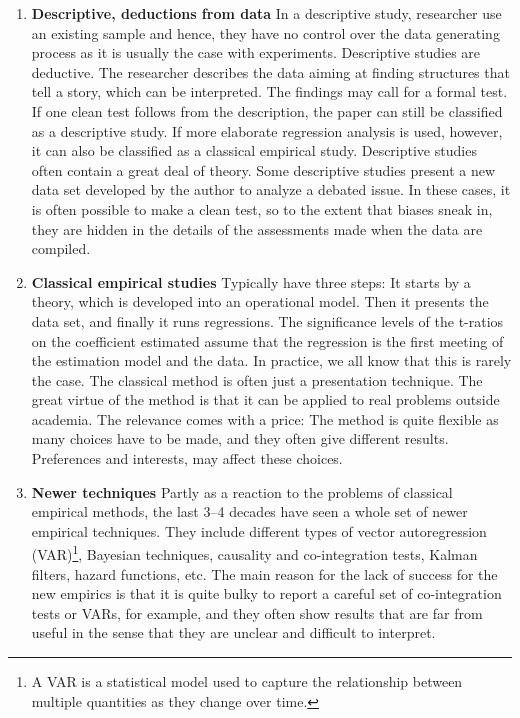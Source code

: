 \documentclass[
  12pt,
  oneside]{book}
\theoremstyle{definition}
\theoremstyle{definition}
\theoremstyle{definition}
\theoremstyle{definition}
\theoremstyle{remark}
\begin{document}
\begin{enumerate}
\def\labelenumi{\arabic{enumi}.}
\setcounter{enumi}{5}
\item
  \textbf{Descriptive, deductions from data} In a descriptive study, researcher use an existing sample and hence, they have no control over the data generating process as it is usually the case with experiments. Descriptive studies are deductive. The researcher describes the data aiming at finding structures that tell a story, which can be interpreted. The findings may call for a formal test. If one clean test follows from the description, the paper can still be classified as a descriptive study. If more elaborate regression analysis is used, however, it can also be classified as a classical empirical study. Descriptive studies often contain a great deal of theory. Some descriptive studies present a new data set developed by the author to analyze a debated issue. In these cases, it is often possible to make a clean test, so to the extent that biases sneak in, they are hidden in the details of the assessments made when the data are compiled.
\item
  \textbf{Classical empirical studies}
  Typically have three steps: It starts by a theory, which is developed into an operational model. Then it presents the data set, and finally it runs regressions. The significance levels of the t-ratios on the coefficient estimated assume that the regression is the first meeting of the estimation model and the data. In practice, we all know that this is rarely the case. The classical method is often just a presentation technique. The great virtue of the method is that it can be applied to real problems outside academia. The relevance comes with a price: The method is quite flexible as many choices have to be made, and they often give different results. Preferences and interests, may affect these choices.
\item
  \textbf{Newer techniques}
  Partly as a reaction to the problems of classical empirical methods, the last 3--4 decades have seen a whole set of newer empirical techniques. They include different types of vector autoregression (VAR)\footnote{A VAR is a statistical model used to capture the relationship between multiple quantities as they change over time.}, Bayesian techniques, causality and co-integration tests, Kalman filters, hazard functions, etc. The main reason for the lack of success for the new empirics is that it is quite bulky to report a careful set of co-integration tests or VARs, for example, and they often show results that are far from useful in the sense that they are unclear and difficult to interpret.
\end{enumerate}
\end{document}
